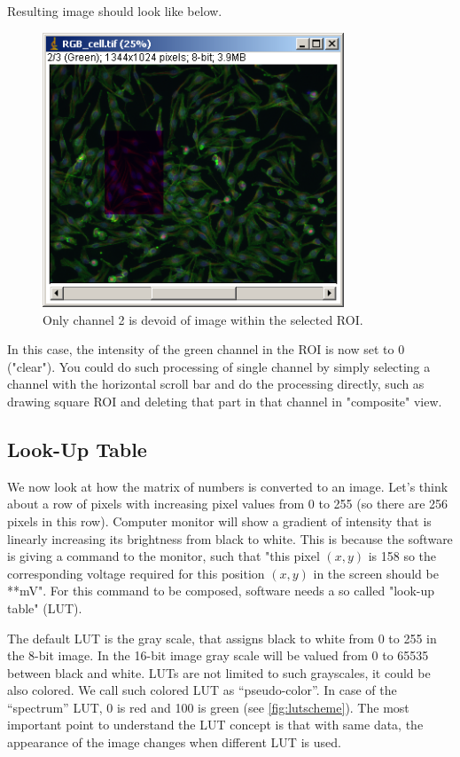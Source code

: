 \begin{indentexercise}{1}
Resulting image should look like below. 
\begin{figure}[H]
\begin{center}
\includegraphics[width=9cm]{fig/CMCIBasicCourse201102-img23.png}
\caption{ Only channel 2 is devoid of image within the selected ROI.}
\label{fig:img23}
\end{center}
\end{figure}

In this case, the intensity of the green channel in the ROI is now set to 0 ("clear"). You could do such
processing of single channel by simply selecting a channel with the horizontal scroll bar and do the processing directly, such as drawing square ROI and deleting that part in that channel in "composite" view. 
\end{indentexercise}

\subsection{Look-Up Table }
\label{subsec:LUT}

We now look at how the matrix of numbers is converted to an image. Let's think about 
a row of pixels with increasing pixel values from 0 to 255 (so there are 256 pixels in this row). 
Computer monitor will show a gradient of intensity that is linearly increasing its brightness 
from black to white. This is because the software is giving a command to the monitor, 
such that "this pixel $(x, y)$ is 158 so the corresponding voltage required for this position $(x, y)$ 
in the screen should be **mV". For this command to be composed, software needs a so called "look-up table" (LUT). 

The default LUT is the gray scale, that assigns black to white from 0 to 255 in the 8-bit image. In the 16-bit image gray scale will be valued from 0 to 65535 between black and white. LUTs are not limited to such grayscales, it could be also colored. We call such colored LUT as ``pseudo-color''. In case of the ``spectrum'' LUT, 0 is red and 100 is green  (see \ref{fig:lutscheme}). The most important point to understand the LUT concept is that with same data, the appearance of the image changes when different LUT is used.  

